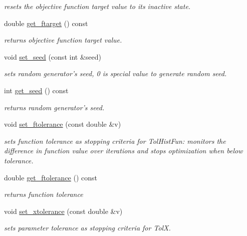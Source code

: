 \begin{DoxyCompactItemize}
\begin{DoxyCompactList}\small\item\em resets the objective function target value to its inactive state. \end{DoxyCompactList}\item 
double \hyperlink{classlibcmaes_1_1Parameters_ae7b39c351afbbb75a657ea5990899782}{get\+\_\+ftarget} () const 
\begin{DoxyCompactList}\small\item\em returns objective function target value. \end{DoxyCompactList}\item 
void \hyperlink{classlibcmaes_1_1Parameters_ac27d3bc99f554d771c24a1129ece2181}{set\+\_\+seed} (const int \&seed)
\begin{DoxyCompactList}\small\item\em sets random generator's seed, 0 is special value to generate random seed. \end{DoxyCompactList}\item 
int \hyperlink{classlibcmaes_1_1Parameters_af98c1effaa3e0a4321ae5046f1bdd615}{get\+\_\+seed} () const 
\begin{DoxyCompactList}\small\item\em returns random generator's seed. \end{DoxyCompactList}\item 
void \hyperlink{classlibcmaes_1_1Parameters_ad01dddcc81b121f20afeaafc09537304}{set\+\_\+ftolerance} (const double \&v)
\begin{DoxyCompactList}\small\item\em sets function tolerance as stopping criteria for Tol\+Hist\+Fun\+: monitors the difference in function value over iterations and stops optimization when below tolerance. \end{DoxyCompactList}\item 
double \hyperlink{classlibcmaes_1_1Parameters_a64b1867aa4d9aeb946e923d42452ff8d}{get\+\_\+ftolerance} () const 
\begin{DoxyCompactList}\small\item\em returns function tolerance \end{DoxyCompactList}\item 
void \hyperlink{classlibcmaes_1_1Parameters_aa131adbd299a29259034cac7cfe83009}{set\+\_\+xtolerance} (const double \&v)
\begin{DoxyCompactList}\small\item\em sets parameter tolerance as stopping criteria for Tol\+X. \end{DoxyCompactList}\item 

\end{DoxyCompactItemize}
